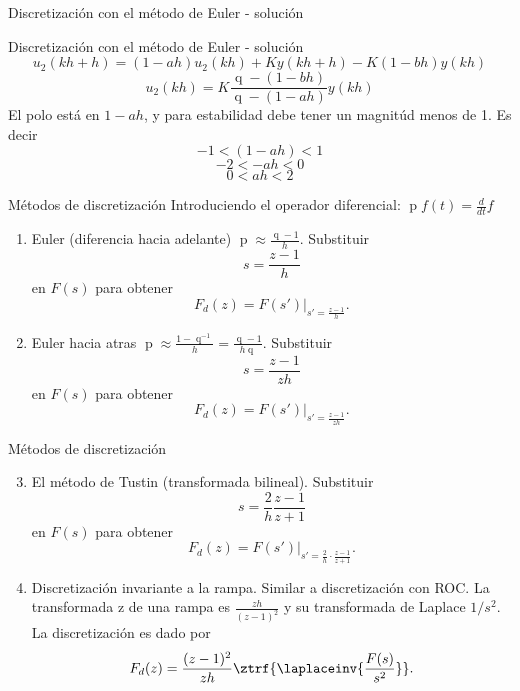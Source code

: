 \documentclass[presentation,aspectratio=1610]{beamer}
\DeclareMathOperator{\shift}{q}
\DeclareMathOperator{\diff}{p}
\begin{document}
\begin{frame}[label={sec:org97d9970}]{Discretización con el método de Euler - solución}
\end{frame}

\begin{frame}[label={sec:orgcc76a53}]{Discretización con el método de Euler - solución}
\[ u_2(kh+h) = (1-ah)u_2(kh) + Ky(kh+h) - K(1-bh)y(kh) \]
\[ u_2(kh) = K \frac{\shift - (1-bh)}{\shift - (1-ah)} y(kh)\]
El polo está en \(1-ah\), y para estabilidad debe tener un magnitúd menos de 1. Es decir 
\[ -1 < (1-ah) < 1\]
\[ -2 < -ah < 0 \]
\[ 0 < ah < 2\]
\begin{center}
\end{center}
\end{frame}


\begin{frame}[label={sec:org111fcfa}]{Métodos de discretización}
Introduciendo el operador diferencial:  \(\diff f(t) = \frac{d}{dt} f\)

\begin{enumerate}
\item Euler (diferencia hacia adelante) \(\diff \approx \frac{\shift -1}{h}\). Substituir
\[ s = \frac{z-1}{h} \] en \(F(s)\) para obtener
\[ F_d(z) = F(s')|_{s'=\frac{z-1}{h}}. \]
\item Euler hacia atras \(\diff \approx \frac{1 - \shift^{-1}}{h} = \frac{\shift -1}{h\shift}\). Substituir
\[ s = \frac{z-1}{zh} \] en \(F(s)\) para obtener
\[ F_d(z) = F(s')|_{s'=\frac{z-1}{zh}}. \]
\end{enumerate}
\end{frame}

\begin{frame}[label={sec:orga382c70}]{Métodos de discretización}
\begin{enumerate}
\setcounter{enumi}{2}
\item El método de Tustin (transformada bilineal). Substituir
\[ s = \frac{2}{h}\frac{z-1}{z+1} \] en \(F(s)\) para obtener
\[ F_d(z) = F(s')|_{s'=\frac{2}{h}\cdot \frac{z-1}{z+1}}. \]
\item Discretización invariante a la rampa. Similar a discretización con ROC. La transformada z de una rampa es  \(\frac{zh}{(z-1)^2}\) y su transformada de Laplace \(1/s^2\). La discretización es dado por
\[ F_d(z) = \frac{(z-1)^2}{zh} \ztrf{\laplaceinv{\frac{F(s)}{s^2}}}. \]
\end{enumerate}
\end{frame}
\end{document}
